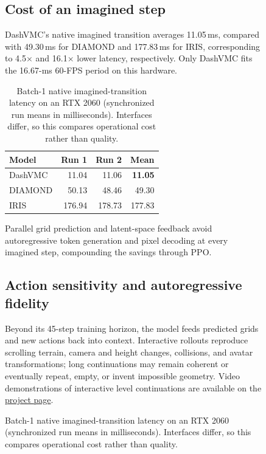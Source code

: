 \begin{figure}[!htbp]
\FloatBarrier
\subsection{Cost of an imagined step}
\label{sec:transition-latency}

DashVMC's native imagined transition averages 11.05\,ms, compared with 49.30\,ms for DIAMOND and 177.83\,ms for IRIS, corresponding to 4.5$\times$ and 16.1$\times$ lower latency, respectively.
Only DashVMC fits the 16.67-ms 60-FPS period on this hardware.

\begin{table}[H]
  \centering
  \footnotesize
  \setlength{\tabcolsep}{4pt}
  \caption{Batch-1 native imagined-transition latency on an RTX 2060 (synchronized run means in milliseconds). Interfaces differ, so this compares operational cost rather than quality.}
  \label{tab:transition-latency}
  \begin{tabular}{lrrr}
    \toprule
    Model & Run 1 & Run 2 & Mean \\
    \midrule
    DashVMC & 11.04 & 11.06 & \textbf{11.05} \\
    DIAMOND & 50.13 & 48.46 & 49.30 \\
    IRIS & 176.94 & 178.73 & 177.83 \\
    \bottomrule
  \end{tabular}
\end{table}

Parallel grid prediction and latent-space feedback avoid autoregressive token generation and pixel decoding at every imagined step, compounding the savings through PPO.

\FloatBarrier
\subsection{Action sensitivity and autoregressive fidelity}
\label{sec:continuations}

Beyond its 45-step training horizon, the model feeds predicted grids and new actions back into context.
Interactive rollouts reproduce scrolling terrain, camera and height changes, collisions, and avatar transformations; long continuations may remain coherent or eventually repeat, empty, or invent impossible geometry.
Video demonstrations of interactive level continuations are available on the \href{https://tariolle.github.io/dash-vmc/\#dreams}{project page}.


\end{figure}
